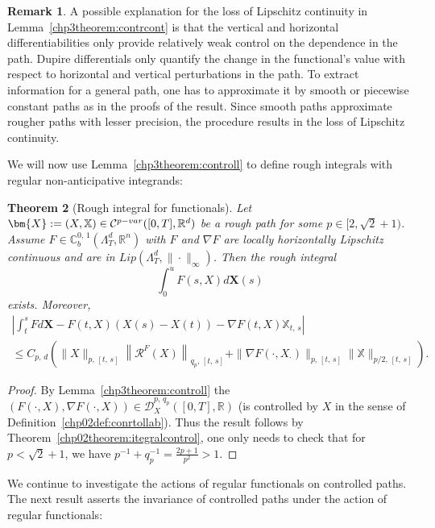 \documentclass[10pt]{amsart}
\newtheorem{theo}{Theorem}[section]
\theoremstyle{definition}\newtheorem{defi}[theo]{Definition}\newtheorem{rema}[theo]{Remark}\newtheorem{exam}[theo]{Example}\newtheorem{exem}[theo]{Example}\newtheorem{nota}[theo]{Notation}
\newcommand{\scrD}{\mathscr{D}}
\newcommand{\bbX}{\mathbb{X}}
\newcommand{\bbC}{\mathbb{C}}
\newcommand{\calR}{\mathcal{R}}
\newcommand{\calC}{\mathcal{C}}
\newcommand{\Rr}{{\mathbb{R}}}
\begin{document}
\begin{rema}\label{remark:Lipcontrol2}
A possible explanation for the loss of Lipschitz continuity in Lemma~\ref{chp3theorem:contrcont} is that the vertical and horizontal differentiabilities only provide relatively weak control on the dependence in the path. Dupire differentials only quantify the change in the functional's value with respect to horizontal and vertical perturbations in the path. To extract information for a general path, one has to approximate it by smooth or piecewise constant paths as in the proofs of the result. Since smooth paths approximate rougher paths with lesser precision, the procedure results in the loss of Lipschitz continuity.
\end{rema}

We will now use Lemma~\ref{chp3theorem:controll} to define rough integrals with regular non-anticipative integrands:
\begin{theo}[Rough integral for functionals]\label{chp3theorem:roughpathint}
Let $\bm{X}:=(X, \bbX)\in\calC^{p-var}\linebreak([0,T],\Rr^d)$ be a rough path for some $p\in [2, \sqrt{2}+1)$.
Assume $F\in \bbC^{0,\,1}_b(\Lambda^d_T,\Rr^n)$ with $F$ and $ \nabla F$ are locally horizontally Lipschitz continuous and are in $Lip(\Lambda^d_T, \|\cdot\|_{\infty})$. Then the rough integral
\begin{equation}\label{chp3def.integral}
\int_0^u F(s, X)d\bm{X}(s)
\end{equation}
exists. Moreover,
\begin{multline*}
\left|\int_t^s Fd\bm{X}-F(t,X)(X(s)-X(t))-\nabla F(t,X)\bbX_{t,\,s}\right|\\
\leq
C_{p,\,d}\left(\|X\|_{p,\,[t,\,s]}\left\|\calR^{F}(X)\right\|_{q_{p},\,[t,\,s]}+\|\nabla F(\cdot,X_{\cdot})\|_{p,\,[t,\,s]}\|\bbX\|_{p/2,\,[t,\,s]}\right).
\end{multline*}
\end{theo}


\begin{proof}
By Lemma~\ref{chp3theorem:controll} the $(F(\cdot, X), \nabla F(\cdot, X))\in \scrD^{p,\,q_p}_{X}([0,T],\Rr)$ (is controlled by $X$ in the sense of Definition~\ref{chp02def:conrtollab}). Thus the result follows by Theorem~\ref{chp02theorem:itegralcontrol}, one only needs to check that for $p<\sqrt{2}+1$, we have $p^{-1}+q_p^{-1}= \frac{2p+1}{p^2}>1$.
\end{proof}



We continue to investigate the actions of regular functionals on controlled paths. The next result asserts the invariance of controlled paths under the action of regular functionals:
\end{document}
